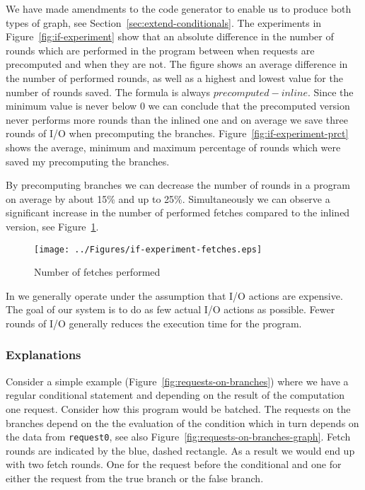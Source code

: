 We have made amendments to the code generator to enable us to produce both types of graph, see Section~\ref{sec:extend-conditionals}.
The experiments in Figure~\ref{fig:if-experiment} show that an absolute difference in the number of rounds which are performed in the program between when requests are precomputed and when they are not.
The figure shows an average difference in the number of performed rounds, as well as a highest and lowest value for the number of rounds saved.
The formula is always $precomputed - inline$.
Since the minimum value is never below $0$ we can conclude that the precomputed version never performs more rounds than the inlined one and on average we save three rounds of I/O when precomputing the branches.
Figure~\ref{fig:if-experiment-prct} shows the average, minimum and maximum percentage of rounds which were saved my precomputing the branches.

By precomputing branches we can decrease the number of rounds in a program on average by about 15\% and up to 25\%.
Simultaneously we can observe a significant increase in the number of performed fetches compared to the inlined version, see Figure~\ref{fig:if-experiment-fetches}.

\begin{figure}[h]
    \texttt{[image: ../Figures/if-experiment-fetches.eps]}
    \caption{Number of fetches performed}
    \label{fig:if-experiment-fetches}
\end{figure}

In \yauhau{} we generally operate under the assumption that I/O actions are expensive.
The goal of our system is to do as few actual I/O actions as possible.
Fewer rounds of I/O generally reduces the execution time for the program.

\subsubsection{Explanations}

Consider a simple example (Figure~\ref{fig:requests-on-branches}) where we have a regular conditional statement and depending on the result of the computation one request.
Consider how this program would be batched.
The requests on the branches depend on the the evaluation of the condition which in turn depends on the data from \texttt{request0}, see also Figure~\ref{fig:requests-on-branches-graph}.
Fetch rounds are indicated by the blue, dashed rectangle.
As a result we would end up with two fetch rounds.
One for the request before the conditional and one for either the request from the true branch or the false branch.

